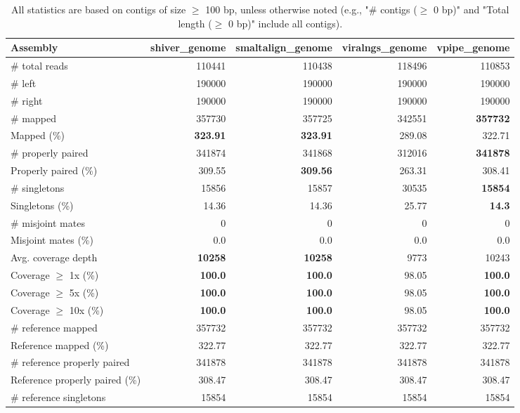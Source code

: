 \documentclass[12pt,a4paper]{article}
\begin{document}
\begin{table}[ht]
\begin{center}
\caption{All statistics are based on contigs of size $\geq$ 100 bp, unless otherwise noted (e.g., "\# contigs ($\geq$ 0 bp)" and "Total length ($\geq$ 0 bp)" include all contigs).}
\begin{tabular}{|l*{4}{|r}|}
\hline
Assembly & shiver\_genome & smaltalign\_genome & viralngs\_genome & vpipe\_genome \\ \hline
\# total reads & 110441 & 110438 & 118496 & 110853 \\ \hline
\# left & 190000 & 190000 & 190000 & 190000 \\ \hline
\# right & 190000 & 190000 & 190000 & 190000 \\ \hline
\# mapped & 357730 & 357725 & 342551 & {\bf 357732} \\ \hline
Mapped (\%) & {\bf 323.91} & {\bf 323.91} & 289.08 & 322.71 \\ \hline
\# properly paired & 341874 & 341868 & 312016 & {\bf 341878} \\ \hline
Properly paired (\%) & 309.55 & {\bf 309.56} & 263.31 & 308.41 \\ \hline
\# singletons & 15856 & 15857 & 30535 & {\bf 15854} \\ \hline
Singletons (\%) & 14.36 & 14.36 & 25.77 & {\bf 14.3} \\ \hline
\# misjoint mates & 0 & 0 & 0 & 0 \\ \hline
Misjoint mates (\%) & 0.0 & 0.0 & 0.0 & 0.0 \\ \hline
Avg. coverage depth & {\bf 10258} & {\bf 10258} & 9773 & 10243 \\ \hline
Coverage $\geq$ 1x (\%) & {\bf 100.0} & {\bf 100.0} & 98.05 & {\bf 100.0} \\ \hline
Coverage $\geq$ 5x (\%) & {\bf 100.0} & {\bf 100.0} & 98.05 & {\bf 100.0} \\ \hline
Coverage $\geq$ 10x (\%) & {\bf 100.0} & {\bf 100.0} & 98.05 & {\bf 100.0} \\ \hline
\# reference mapped & 357732 & 357732 & 357732 & 357732 \\ \hline
Reference mapped (\%) & 322.77 & 322.77 & 322.77 & 322.77 \\ \hline
\# reference properly paired & 341878 & 341878 & 341878 & 341878 \\ \hline
Reference properly paired (\%) & 308.47 & 308.47 & 308.47 & 308.47 \\ \hline
\# reference singletons & 15854 & 15854 & 15854 & 15854 \\ \hline

\end{tabular}
\end{center}
\end{table}
\end{document}
